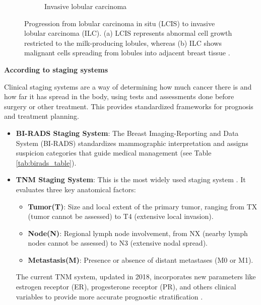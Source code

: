 \documentclass[a4paper,10pt]{book}
\begin{document}
\begin{figure}[h!]
\begin{subfigure}[c]{0.48\textwidth}
		\caption{Invasive lobular carcinoma}
		\label{fig:ilc}
	\end{subfigure}
	\caption[LCIS vs. ILC comparison]{Progression from lobular carcinoma in situ (LCIS) to invasive lobular carcinoma (ILC). (a) LCIS represents abnormal cell growth restricted to the milk-producing lobules, whereas (b) ILC shows malignant cells spreading from lobules into adjacent breast tissue \cite{noauthor_nci_2011}.}
\label{fig:histological_types_two}
\end{figure}

\textbf{According to staging systems}

Clinical staging systems are a way of determining how much cancer there is and how far it has spread in the body, using tests and assessments done before surgery or other treatment. This provides standardized frameworks for prognosis and treatment planning.

\begin{itemize}
	\item \textbf{BI-RADS Staging System}: The Breast Imaging-Reporting and Data System (BI-RADS)\cite{magny_breast_2025} standardizes mammographic interpretation and assigns suspicion categories that guide medical management (see Table \ref{tab:birads_table}).
    \item  \textbf{TNM Staging System}: This is the most widely used staging system \cite{noauthor_stages_nodate}. It evaluates three key anatomical factors:
    \begin{itemize}
        \item \textbf{Tumor(T)}: Size and local extent of the primary tumor, ranging from TX (tumor cannot be assessed) to T4 (extensive local invasion).
        \item \textbf{Node(N)}: Regional lymph node involvement, from NX (nearby lymph nodes cannot be assessed) to N3 (extensive nodal spread).
        \item \textbf{Metastasis(M)}: Presence or absence of distant metastases (M0 or M1).
  \end{itemize}
  The current TNM system, updated in 2018, incorporates new parameters like estrogen receptor (ER), progesterone receptor (PR), and others clinical variables to provide more accurate prognostic stratification \cite{hortobagyi_new_2018}. 
  
\end{itemize}
\end{document}
